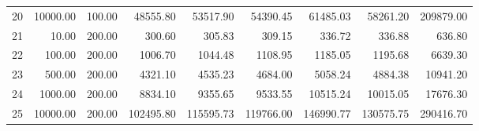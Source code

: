 \begin{table}[ht]
\begin{tabular}{rrrrrrrrr}
  20 & 10000.00 & 100.00 & 48555.80 & 53517.90 & 54390.45 & 61485.03 & 58261.20 & 209879.00 \\ 
  21 & 10.00 & 200.00 & 300.60 & 305.83 & 309.15 & 336.72 & 336.88 & 636.80 \\ 
  22 & 100.00 & 200.00 & 1006.70 & 1044.48 & 1108.95 & 1185.05 & 1195.68 & 6639.30 \\ 
  23 & 500.00 & 200.00 & 4321.10 & 4535.23 & 4684.00 & 5058.24 & 4884.38 & 10941.20 \\ 
  24 & 1000.00 & 200.00 & 8834.10 & 9355.65 & 9533.55 & 10515.24 & 10015.05 & 17676.30 \\ 
  25 & 10000.00 & 200.00 & 102495.80 & 115595.73 & 119766.00 & 146990.77 & 130575.75 & 290416.70 \\ 
   \hline
\end{tabular}
\end{table}
